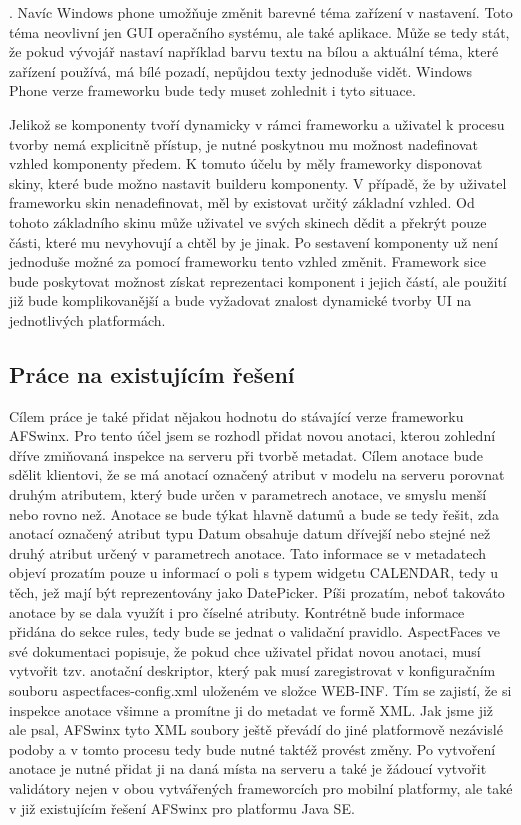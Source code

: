 . Navíc Windows phone umožňuje změnit barevné téma zařízení v nastavení. Toto téma neovlivní jen GUI operačního systému, ale také aplikace. Může se tedy stát, že pokud vývojář nastaví například barvu textu na bílou a aktuální téma, které zařízení používá, má bílé pozadí, nepůjdou texty jednoduše vidět. Windows Phone verze frameworku bude tedy muset zohlednit i tyto situace.

Jelikož se komponenty tvoří dynamicky v rámci frameworku a uživatel k procesu tvorby nemá explicitně přístup, je nutné poskytnou mu možnost nadefinovat vzhled komponenty předem. K tomuto účelu by měly frameworky disponovat skiny, které bude možno nastavit builderu komponenty. V případě, že by uživatel frameworku skin nenadefinovat, měl by existovat určitý základní vzhled. Od tohoto základního skinu může uživatel ve svých skinech dědit a překrýt pouze části, které mu nevyhovují a chtěl by je jinak. Po sestavení komponenty už není jednoduše možné za pomocí frameworku tento vzhled změnit. Framework sice bude poskytovat možnost získat reprezentaci komponent i jejich částí, ale použití již bude komplikovanější a bude vyžadovat znalost dynamické tvorby UI na jednotlivých platformách.

\subsection{Práce na existujícím řešení}
Cílem práce je také přidat nějakou hodnotu do stávající verze frameworku AFSwinx. Pro tento účel jsem se rozhodl přidat novou anotaci, kterou zohlední dříve zmiňovaná inspekce na serveru při tvorbě metadat. Cílem anotace bude sdělit klientovi, že se má anotací označený atribut v modelu na serveru porovnat druhým atributem, který bude určen v parametrech anotace, ve smyslu menší nebo rovno než. Anotace se bude týkat hlavně datumů a bude se tedy řešit, zda anotací označený atribut typu Datum obsahuje datum dřívejší nebo stejné než druhý atribut určený v parametrech anotace. Tato informace se v metadatech objeví prozatím pouze u informací o poli s typem widgetu CALENDAR, tedy u těch, jež mají být reprezentovány jako DatePicker. Píši prozatím, neboť takováto anotace by se dala využít i pro číselné atributy. Kontrétně bude informace přidána do sekce rules, tedy bude se jednat o validační pravidlo. AspectFaces \cite{aspect-faces} ve své dokumentaci popisuje, že pokud chce uživatel přidat novou anotaci, musí vytvořit tzv. anotační deskriptor, který pak musí zaregistrovat v konfiguračním souboru aspectfaces-config.xml uloženém ve složce WEB-INF. Tím se zajistí, že si inspekce anotace všimne a promítne ji do metadat ve formě XML. Jak jsme již ale psal, AFSwinx tyto XML soubory ještě převádí do jiné platformově nezávislé podoby a v tomto procesu tedy bude nutné taktéž provést změny. Po vytvoření anotace je nutné přidat ji na daná místa na serveru a také je žádoucí vytvořit validátory nejen v obou vytvářených frameworcích pro mobilní platformy, ale také v již existujícím řešení AFSwinx pro platformu Java SE.



